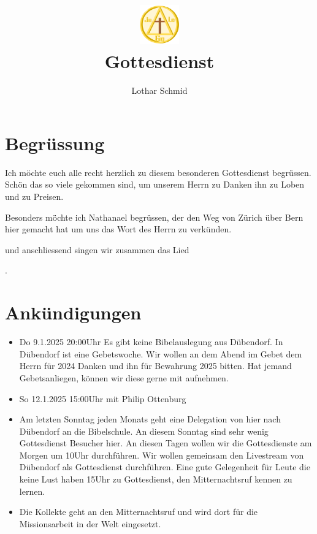 \documentclass{../inc/mybib}
\title{\includegraphics[height=48pt]{assets/images/logo.png}\\Gottesdienst}
\author{Lothar Schmid}
\begin{document}
\maketitle
\section{Begrüssung}

Ich möchte euch alle recht herzlich zu diesem besonderen Gottesdienst begrüssen. Schön das so viele gekommen sind, um unserem Herrn zu Danken ihn zu Loben und zu Preisen.

Besonders möchte ich Nathanael begrüssen, der den Weg von Zürich über Bern hier gemacht hat um uns das Wort des Herrn zu verkünden. 

\noindent
\beten{} und anschliessend singen wir zusammen das Lied

\noindent
{}.

\section{Ankündigungen}
\begin{itemize}
    \item {} Do 9.1.2025 20:00Uhr Es gibt keine Bibelauslegung aus Dübendorf. In Dübendorf ist eine Gebetswoche. Wir wollen an dem Abend im Gebet dem Herrn für 2024 Danken und ihn für Bewahrung 2025 bitten. Hat jemand Gebetsanliegen, können wir diese gerne mit aufnehmen.
    \item {} So 12.1.2025 15:00Uhr mit Philip Ottenburg
    \item {} Am letzten Sonntag jeden Monats geht eine Delegation von hier nach Dübendorf an die Bibelschule. An diesem Sonntag sind sehr wenig Gottesdienst Besucher hier. An diesen Tagen wollen wir die Gottesdienste am Morgen um 10Uhr durchführen. Wir wollen gemeinsam den Livestream von Dübendorf als Gottesdienst durchführen. Eine gute Gelegenheit für Leute die keine Lust haben 15Uhr zu Gottesdienst, den Mitternachtsruf kennen zu lernen.
    \item {} Die Kollekte geht an den Mitternachtsruf und wird dort für die Missionsarbeit in der Welt eingesetzt.
\end{itemize}
\end{document}

